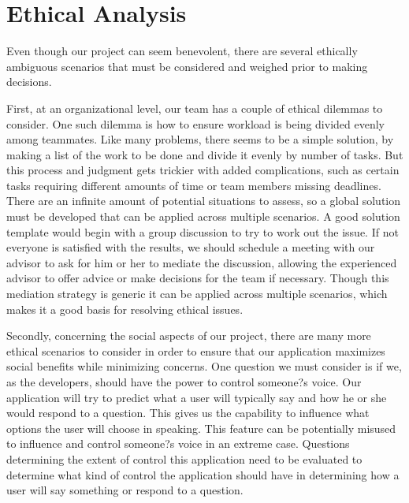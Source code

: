 \chapter{Ethical Analysis}

Even though our project can seem benevolent, there are several ethically ambiguous scenarios that must be considered and weighed prior to making decisions.


First, at an organizational level, our team has a couple of ethical dilemmas to consider. One such dilemma is how to ensure workload is being divided evenly among teammates. Like many problems, there seems to be a simple solution, by making a list of the work to be done and divide it evenly by number of tasks. But this process and judgment gets trickier with added complications, such as certain tasks requiring different amounts of time or team members missing deadlines. There are an infinite amount of potential situations to assess, so a global solution must be developed that can be applied across multiple scenarios. A good solution template would begin with a group discussion to try to work out the issue. If not everyone is satisfied with the results, we should schedule a meeting with our advisor to ask for him or her to mediate the discussion, allowing the experienced advisor to offer advice or make decisions for the team if necessary. Though this mediation strategy is generic it can be applied across multiple scenarios, which makes it a good basis for resolving ethical issues.


Secondly, concerning the social aspects of our project, there are many more ethical scenarios to consider in order to ensure that our application maximizes social benefits while minimizing concerns. One question we must consider is if we, as the developers, should have the power to control someone?s voice. Our application will try to predict what a user will typically say and how he or she would respond to a question. This gives us the capability to influence what options the user will choose in speaking. This feature can be potentially misused to influence and control someone?s voice in an extreme case. Questions determining the extent of control this application need to be evaluated to determine what kind of control the application should have in determining how a user will say something or respond to a question.


